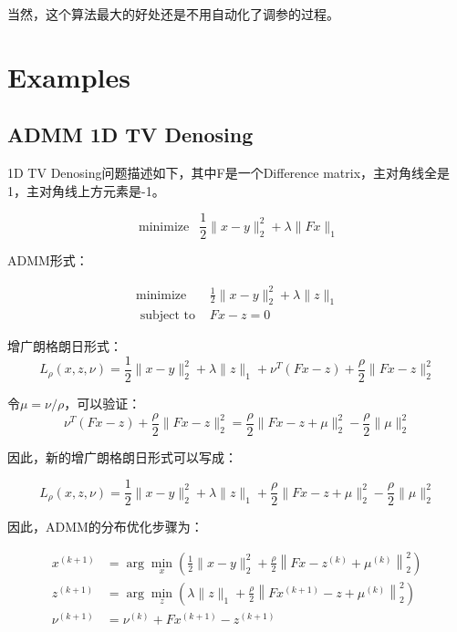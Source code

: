 \documentclass[10pt]{article}
\begin{document}
当然，这个算法最大的好处还是不用自动化了调参的过程。

\section{Examples}

\subsection{ADMM 1D TV Denosing}

1D TV Denosing问题描述如下，其中F是一个Difference matrix，主对角线全是1，主对角线上方元素是-1。

\begin{equation}
	\operatorname{minimize} \enspace \frac{1}{2} \|x-y\|_{2}^{2}+\lambda\|F x\|_{1}
\end{equation}

ADMM形式：

\begin{equation}
\begin{array}{ll}
\operatorname{minimize} & \frac{1}{2} \|x-y\|_{2}^{2}+\lambda\|z\|_{1} \\
\text { subject to } & F x-z=0
\end{array}
\end{equation}

增广朗格朗日形式：
\begin{equation}
L_{\rho}( x , z , \nu )= \frac{1}{2}\|x-y\|_{2}^{2} + \lambda\|z\|_{1}+ \nu ^{ T }(Fx-z)+\frac{\rho}{2}\|Fx-z\|_{2}^{2}
\label{eq-3}
\end{equation}

令$\mu = \nu / \rho$，可以验证：
\begin{equation}
\nu ^{ T }(Fx-z)+\frac{\rho}{2}\| Fx-z\|_{2}^{2}= \frac{\rho}{2}\|Fx-z+ \mu \|_{2}^{2}-\frac{\rho}{2}\| \mu \|_{2}^{2}
\end{equation}

因此，新的增广朗格朗日形式可以写成：

\begin{equation}
L_{\rho}( x , z , \nu )= \frac{1}{2}\|x-y\|_{2}^{2} + \lambda\|z\|_{1}+ \frac{\rho}{2}\|Fx-z+ \mu \|_{2}^{2}-\frac{\rho}{2}\| \mu \|_{2}^{2}
\end{equation}

因此，ADMM的分布优化步骤为：

\begin{equation}
\begin{aligned}
x ^{(k+1)} &=\arg \min _{ x }\left(\frac{1}{2} \|x-y\|_{2}^{2}+\frac{\rho}{2}\left\| Fx-z ^{(k)}+ \mu ^{(k)}\right\|_{2}^{2}\right) \\
z ^{(k+1)} &=\arg \min _{ z }\left(\lambda\|z\|_{1}+\frac{\rho}{2}\left\| Fx ^{(k+1)}- z + \mu ^{(k)}\right\|_{2}^{2}\right) \\
\nu ^{(k+1)} &= \nu ^{(k)}+ Fx ^{(k+1)}- z ^{(k+1)}
\end{aligned}
\label{eq-6}
\end{equation}
\end{document}
